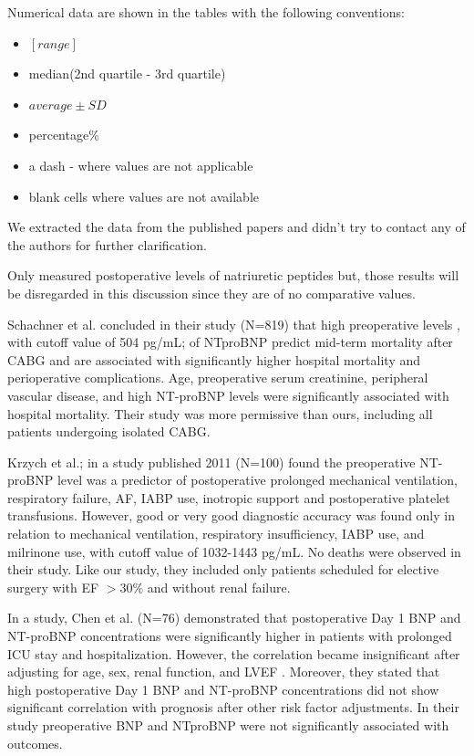 \documentclass[14pt,a4paper,onecolumn]{extarticle}
\begin{document}
Numerical data are shown in the tables with the following conventions:
\begin{itemize}
  \item $[range]$
  \item median(2nd quartile - 3rd quartile)
  \item $average\pm SD$
  \item percentage\%
  \item a dash - where values are not applicable
  \item blank cells where values are not available
\end{itemize}

We extracted the data from the published papers and didn't try to contact any of the authors for further clarification.

Only \cite{Chen2013} measured postoperative levels of natriuretic peptides but, those results will be disregarded in this discussion since they are of no comparative values. %

Schachner et al. concluded in their study (N=819) that high preoperative levels , with cutoff value of 504 pg/mL; of NTproBNP predict mid-term mortality after CABG and are associated with significantly higher hospital mortality and perioperative complications.  Age, preoperative serum creatinine, peripheral vascular disease, and high NT-proBNP levels were significantly associated with hospital mortality.  Their study was more permissive than ours, including all patients undergoing isolated CABG. \citep{Schachner2010}

Krzych et al.; in a study published 2011 (N=100) found the preoperative NT-proBNP level was a predictor of postoperative prolonged mechanical ventilation, respiratory failure, AF, IABP use, inotropic support and postoperative platelet transfusions. However, good or very good diagnostic accuracy was found only in relation to mechanical ventilation, respiratory insufficiency, IABP use, and milrinone use, with cutoff value of 1032-1443 pg/mL. No deaths were observed in their study. \citep{Krzych2011}  Like our study, they included only patients scheduled for elective surgery with EF $> 30\%$ and without renal failure.

In a study, Chen et al. (N=76) demonstrated that postoperative Day 1 BNP and NT-proBNP concentrations were significantly higher in patients with prolonged ICU stay and hospitalization. However, the correlation became insignificant after adjusting for age, sex,  renal function, and LVEF \citep{Chen2013}. Moreover, they stated that high postoperative Day 1 BNP and NT-proBNP concentrations did not show significant correlation with prognosis after other risk factor adjustments.  In their study preoperative BNP and NTproBNP were not significantly associated with outcomes.
\end{document}
